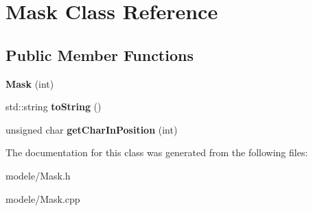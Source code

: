 \hypertarget{class_mask}{\section{Mask Class Reference}
\label{class_mask}
}
\subsection*{Public Member Functions}
\begin{DoxyCompactItemize}
\item 
\hypertarget{class_mask_a891ac691d21a21344d3953a78c7e3bb3}{{\bfseries Mask} (int)}\label{class_mask_a891ac691d21a21344d3953a78c7e3bb3}

\item 
\hypertarget{class_mask_a0756552643d4256f47651de53f9efd69}{std\-::string {\bfseries to\-String} ()}\label{class_mask_a0756552643d4256f47651de53f9efd69}

\item 
\hypertarget{class_mask_a2d70eacd574366bdebd679726363f149}{unsigned char {\bfseries get\-Char\-In\-Position} (int)}\label{class_mask_a2d70eacd574366bdebd679726363f149}

\end{DoxyCompactItemize}


The documentation for this class was generated from the following files\-:\begin{DoxyCompactItemize}
\item 
modele/Mask.\-h\item 
modele/Mask.\-cpp\end{DoxyCompactItemize}
